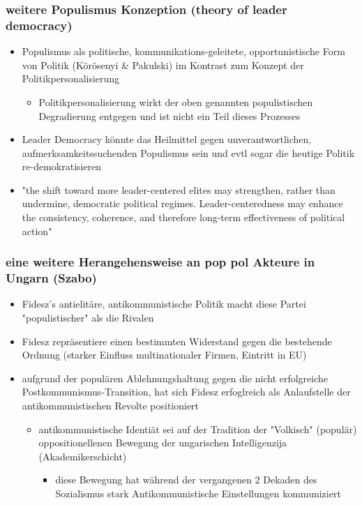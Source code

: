 \documentclass[11pt]{article}
\begin{document}
\subsubsection{weitere Populismus Konzeption (theory of leader democracy)}
\label{sec:org53a974e}
\begin{itemize}
\item Populismus als politische, kommunikations-geleitete, opportunistische Form von Politik (Körösenyi \& Pakulski) im Kontrast zum Konzept der Politikpersonalisierung
\begin{itemize}
\item Politikpersonalisierung wirkt der oben genannten populistischen Degradierung entgegen und ist nicht ein Teil dieses Prozesses
\end{itemize}
\item Leader Democracy könnte das Heilmittel gegen unverantwortlichen, aufmerksamkeitssuchenden Populismus sein und evtl sogar die heutige Politik re-demokratisieren
\item "the shift toward more leader-centered elites may strengthen, rather than undermine, democratic political regimes. Leader-centeredness may enhance the consistency, coherence, and therefore long-term effectiveness of political action"
\end{itemize}

\subsubsection{eine weitere Herangehensweise an pop pol Akteure in Ungarn (Szabo)}
\label{sec:org82d95c5}
\begin{itemize}
\item Fidesz's antielitäre, antikommunistische Politik macht diese Partei "populistischer" als die Rivalen
\item Fidesz repräsentiere einen bestimmten Widerstand gegen die bestehende Ordnung (starker Einfluss multinationaler Firmen, Eintritt in EU)
\item aufgrund der populären Ablehnungshaltung gegen die nicht erfolgreiche Postkommunismus-Transition, hat sich Fidesz erfoglreich als Anlaufstelle der antikommunistischen Revolte positioniert
\begin{itemize}
\item antikommunistische Identiät sei auf der Tradition der "Volkisch" (populär) oppositionellenen Bewegung der ungarischen Intelligenzija (Akademikerschicht)
\begin{itemize}
\item diese Bewegung hat während der vergangenen 2 Dekaden des Sozialismus stark Antikommunistische Einstellungen kommuniziert
\end{itemize}
\end{itemize}
\end{itemize}
\end{document}
